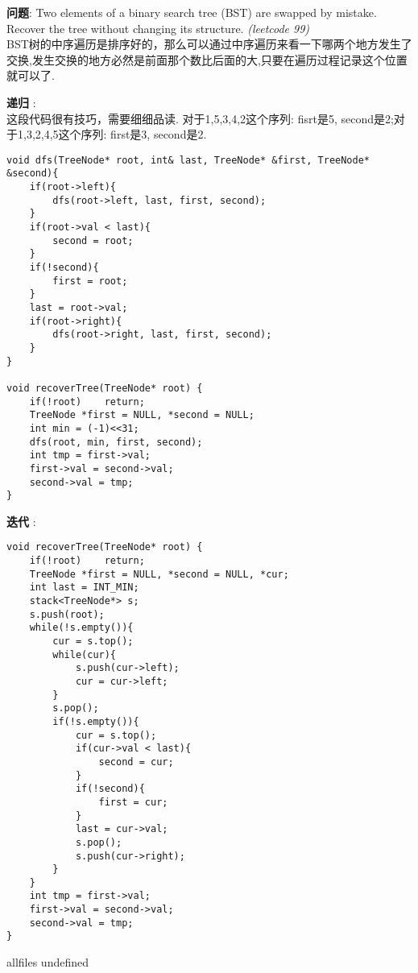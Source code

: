 \documentclass{article}
\begin{document}
\begin{CJK}{UTF8}{gbsn}     %

\else
    
\begin{description}
    \item{\textbf{问题}}: Two elements of a binary search tree (BST) are swapped by mistake. Recover the tree without changing its structure. \textit{(leetcode 99)}
    \\BST树的中序遍历是排序好的，那么可以通过中序遍历来看一下哪两个地方发生了交换,发生交换的地方必然是前面那个数比后面的大,只要在遍历过程记录这个位置就可以了.
    \item{\textbf{递归}} : 
    \\这段代码很有技巧，需要细细品读. 对于1,5,3,4,2这个序列: fisrt是5, second是2;对于1,3,2,4,5这个序列: first是3, second是2.
    \begin{lstlisting}
void dfs(TreeNode* root, int& last, TreeNode* &first, TreeNode* &second){
    if(root->left){
        dfs(root->left, last, first, second);
    }
    if(root->val < last){
        second = root;
    }
    if(!second){
        first = root;
    }
    last = root->val;
    if(root->right){
        dfs(root->right, last, first, second);
    }
}

void recoverTree(TreeNode* root) {
    if(!root)    return;
    TreeNode *first = NULL, *second = NULL;
    int min = (-1)<<31;
    dfs(root, min, first, second);
    int tmp = first->val;
    first->val = second->val;
    second->val = tmp;
}
    \end{lstlisting}
    \item{\textbf{迭代}} : 
    \begin{lstlisting}
void recoverTree(TreeNode* root) {
    if(!root)    return;
    TreeNode *first = NULL, *second = NULL, *cur;
    int last = INT_MIN;
    stack<TreeNode*> s;
    s.push(root);
    while(!s.empty()){
        cur = s.top();
        while(cur){
            s.push(cur->left);
            cur = cur->left;
        }
        s.pop();
        if(!s.empty()){
            cur = s.top();
            if(cur->val < last){
                second = cur;
            }
            if(!second){
                first = cur;
            }
            last = cur->val;
            s.pop();
            s.push(cur->right);
        }
    }
    int tmp = first->val;
    first->val = second->val;
    second->val = tmp;
}
    \end{lstlisting}
\end{description}

\fi

\ifx allfiles undefined
\end{CJK}
\end{document}
